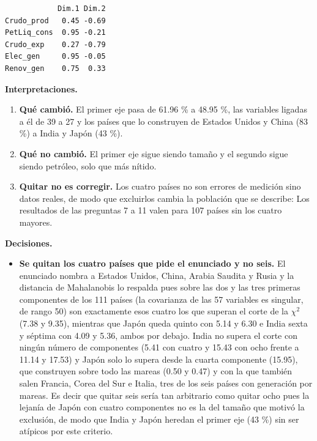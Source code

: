 \documentclass[oneside, openany, fontset=libertinus]{mitthesis}
\newenvironment{Shaded}{\begin{snugshade}}{\end{snugshade}}
\newcommand{\DecValTok}[1]{\textcolor[rgb]{0.68,0.00,0.00}{#1}}
\newcommand{\FunctionTok}[1]{\textcolor[rgb]{0.28,0.35,0.67}{#1}}
\newcommand{\NormalTok}[1]{\textcolor[rgb]{0.00,0.23,0.31}{#1}}
\newcommand{\SpecialCharTok}[1]{\textcolor[rgb]{0.37,0.37,0.37}{#1}}
\providecommand{\tightlist}{\setlength{\itemsep}{0pt}\setlength{\parskip}{0pt}}
\begin{document}
\Needspace{1.33in}

\begin{Shaded}
\end{Shaded}

\begin{verbatim}
            Dim.1 Dim.2
Crudo_prod   0.45 -0.69
PetLiq_cons  0.95 -0.21
Crudo_exp    0.27 -0.79
Elec_gen     0.95 -0.05
Renov_gen    0.75  0.33
\end{verbatim}

\begin{notas}

\textbf{Interpretaciones.}

\begin{enumerate}
\def\labelenumi{\alph{enumi}.}
\tightlist
\item
  \textbf{Qué cambió.} El primer eje pasa de 61.96 \% a 48.95 \%, las
  variables ligadas a él de 39 a 27 y los países que lo construyen de
  Estados Unidos y China (83 \%) a India y Japón (43 \%).
\item
  \textbf{Qué no cambió.} El primer eje sigue siendo tamaño y el segundo
  sigue siendo petróleo, solo que más nítido.
\item
  \textbf{Quitar no es corregir.} Los cuatro países no son errores de
  medición sino datos reales, de modo que excluirlos cambia la población
  que se describe: Los resultados de las preguntas 7 a 11 valen para 107
  países sin los cuatro mayores.
\end{enumerate}

\textbf{Decisiones.}

\begin{itemize}
\item
  \textbf{Se quitan los cuatro países que pide el enunciado y no seis.}
  El enunciado nombra a Estados Unidos, China, Arabia Saudita y Rusia y
  la distancia de Mahalanobis lo respalda pues sobre las dos y las tres
  primeras componentes de los 111 países (la covarianza de las 57
  variables es singular, de rango 50) son exactamente esos cuatro los
  que superan el corte de la \(\chi^2\) (7.38 y 9.35), mientras que
  Japón queda quinto con 5.14 y 6.30 e India sexta y séptima con 4.09 y
  5.36, ambos por debajo. India no supera el corte con ningún número de
  componentes (5.41 con cuatro y 15.43 con ocho frente a 11.14 y 17.53)
  y Japón solo lo supera desde la cuarta componente (15.95), que
  construyen sobre todo las mareas (0.50 y 0.47) y con la que también
  salen Francia, Corea del Sur e Italia, tres de los seis países con
  generación por mareas. Es decir que quitar seis sería tan arbitrario
  como quitar ocho pues la lejanía de Japón con cuatro componentes no es
  la del tamaño que motivó la exclusión, de modo que India y Japón
  heredan el primer eje (43 \%) sin ser atípicos por este criterio.


\end{itemize}
\end{notas}
\end{document}
